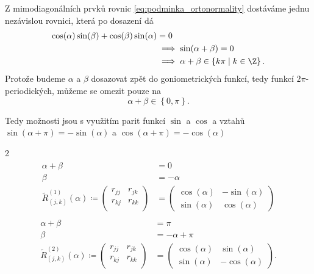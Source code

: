 Z mimodiagonálních prvků rovnic \ref{eq:podminka_ortonormality} dostáváme jednu nezávislou rovnici, která po dosazení dá
\begin{align*}
	\cos(\alpha)\sin(\beta) +\cos(\beta)\sin(\alpha) & = 0                                                               \\
	                                                 & \implies \sin(\alpha + \beta) = 0                                 \\
	                                                 & \implies \alpha + \beta \in \left\{ k \pi \mid k \in \Z \right\}.
\end{align*}
Protože budeme $\alpha$ a $\beta$ dosazovat zpět do goniometrických funkcí, tedy funkcí $2\pi$-periodických, můžeme se omezit pouze na
\[
	\alpha + \beta \in \left\{ 0,\pi \right\} .
\]

Tedy možnosti jsou s využitím parit funkcí $\sin$ a $\cos$ a vztahů $\sin(\alpha + \pi) = -\sin(\alpha)$ a $\cos(\alpha + \pi) = -\cos(\alpha)$
\nopagebreak
\begin{multicols}{2}
	\begin{align}
		\begin{split}
			\label{def:tvar rotace 1}
			\alpha + \beta            & = 0       \\
			\beta                     & = -\alpha \\
			\tilde{R}_{(j,k)}^{(1)}(\alpha) \coloneqq
			\begin{pmatrix}
				r_{jj} & r_{jk} \\
				r_{kj} & r_{kk} \\
			\end{pmatrix} & =
			\begin{pmatrix}
				\cos(\alpha) & -\sin(\alpha) \\
				\sin(\alpha) & \cos(\alpha)
			\end{pmatrix}
		\end{split}
	\end{align}\vfill\null\columnbreak
	\begin{align}
		\begin{split}
			\label{def:tvar rotace 2}
			\alpha + \beta & = \pi \\
			\beta &= -\alpha + \pi \\
			\tilde{R}_{(j,k)}^{(2)}(\alpha) \coloneqq
			\begin{pmatrix}
				r_{jj} & r_{jk} \\
				r_{kj} & r_{kk} \\
			\end{pmatrix} & =
			\begin{pmatrix}
				\cos(\alpha) & \sin(\alpha)  \\
				\sin(\alpha) & -\cos(\alpha)
			\end{pmatrix}
			.\end{split}
	\end{align}\vfill\null
\end{multicols}

